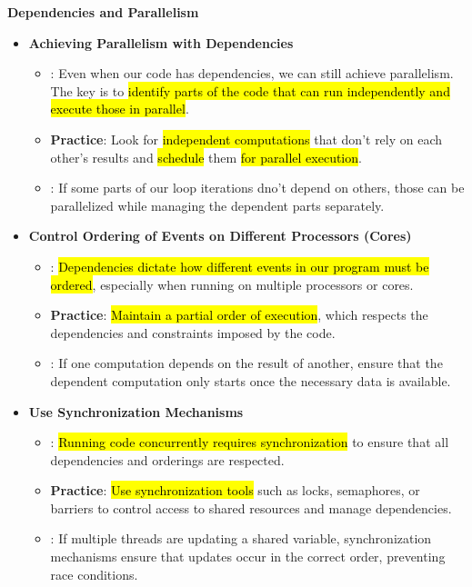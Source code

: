 \newpage

\begin{flushleft}
    \textcolor{Green3}{ \textbf{Dependencies and Parallelism}}
\end{flushleft}
\begin{itemize}
    \item \textbf{Achieving Parallelism with Dependencies}
    \begin{itemize}
        \item {}: Even when our code has dependencies, we can still achieve parallelism. The key is to \hl{identify parts of the code that can run independently and execute those in parallel}.
        \item \textbf{Practice}: Look for \hl{independent computations} that don't rely on each other's results and \hl{schedule} them \hl{for parallel execution}.
        \item {}: If some parts of our loop iterations dno't depend on others, those can be parallelized while managing the dependent parts separately.
    \end{itemize}

    \item \textbf{Control Ordering of Events on Different Processors (Cores)}
    \begin{itemize}
        \item {}: \hl{Dependencies dictate how different events in our program must be ordered}, especially when running on multiple processors or cores.
        \item \textbf{Practice}: \hl{Maintain a partial order of execution}, which respects the dependencies and constraints imposed by the code.
        \item {}: If one computation depends on the result of another, ensure that the dependent computation only starts once the necessary data is available.
    \end{itemize}

    \item \textbf{Use Synchronization Mechanisms}
    \begin{itemize}
        \item {}: \hl{Running code concurrently requires synchronization} to ensure that all dependencies and orderings are respected.
        \item \textbf{Practice}: \hl{Use synchronization tools} such as locks, semaphores, or barriers to control access to shared resources and manage dependencies.
        \item {}: If multiple threads are updating a shared variable, synchronization mechanisms ensure that updates occur in the correct order, preventing race conditions.
    \end{itemize}
\end{itemize}